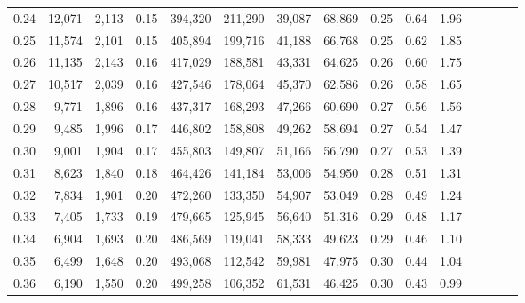 \begin{tabular}{rrrcrrrrrrrrrrr}
0.24 &  12,071 &  2,113 &                                       0.15 &  394,320 &  211,290 &   39,087 &   68,869 &  0.25 &  0.64 &                         1.96 \\
0.25 &  11,574 &  2,101 &                                       0.15 &  405,894 &  199,716 &   41,188 &   66,768 &  0.25 &  0.62 &                         1.85 \\
0.26 &  11,135 &  2,143 &                                       0.16 &  417,029 &  188,581 &   43,331 &   64,625 &  0.26 &  0.60 &                         1.75 \\
0.27 &  10,517 &  2,039 &                                       0.16 &  427,546 &  178,064 &   45,370 &   62,586 &  0.26 &  0.58 &                         1.65 \\
0.28 &   9,771 &  1,896 &                                       0.16 &  437,317 &  168,293 &   47,266 &   60,690 &  0.27 &  0.56 &                         1.56 \\
0.29 &   9,485 &  1,996 &                                       0.17 &  446,802 &  158,808 &   49,262 &   58,694 &  0.27 &  0.54 &                         1.47 \\
0.30 &   9,001 &  1,904 &                                       0.17 &  455,803 &  149,807 &   51,166 &   56,790 &  0.27 &  0.53 &                         1.39 \\
0.31 &   8,623 &  1,840 &                                       0.18 &  464,426 &  141,184 &   53,006 &   54,950 &  0.28 &  0.51 &                         1.31 \\
0.32 &   7,834 &  1,901 &                                       0.20 &  472,260 &  133,350 &   54,907 &   53,049 &  0.28 &  0.49 &                         1.24 \\
0.33 &   7,405 &  1,733 &                                       0.19 &  479,665 &  125,945 &   56,640 &   51,316 &  0.29 &  0.48 &                         1.17 \\
0.34 &   6,904 &  1,693 &                                       0.20 &  486,569 &  119,041 &   58,333 &   49,623 &  0.29 &  0.46 &                         1.10 \\
0.35 &   6,499 &  1,648 &                                       0.20 &  493,068 &  112,542 &   59,981 &   47,975 &  0.30 &  0.44 &                         1.04 \\
0.36 &   6,190 &  1,550 &                                       0.20 &  499,258 &  106,352 &   61,531 &   46,425 &  0.30 &  0.43 &                         0.99 \\

\end{tabular}
